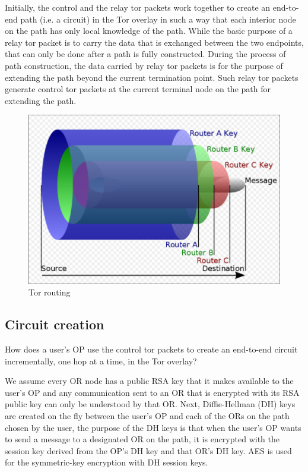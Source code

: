 Initially, the control and the relay tor packets work together to create an end-to-end path (i.e. a circuit) in the Tor overlay in such a way that each interior node on the path has only local knowledge of the path. While the basic purpose of a relay tor packet is to carry the data that is exchanged between the two endpoints, that can only be done after a path is fully constructed. During the process of path construction, the data carried by relay tor packets is for the purpose of extending the path beyond the current termination point. Such relay tor packets generate control tor packets at the current terminal node on the path for extending the path.


\begin{figure}
	\centering
	\includegraphics[width=0.7\linewidth]{Images/Chapter7/tor}
	\caption{Tor routing}
	\label{fig:tor}
\end{figure}

\subsection{Circuit creation}

How does a user’s OP use the control tor packets to create an end-to-end circuit incrementally, one hop at a time, in the Tor overlay?

We assume every OR node has a public RSA key that it makes available to the user’s OP and any communication sent to an OR that is encrypted with its RSA public key can only be understood by that OR. Next, Diffie-Hellman (DH) keys are created on the fly between the user’s OP and each of the ORs on the path chosen by the user, the purpose of the DH keys is that when the user’s OP wants to send a message to a designated OR on the path, it is encrypted with the session key derived from the OP’s DH key and that OR’s DH key. AES is used for the symmetric-key encryption with DH session keys.

